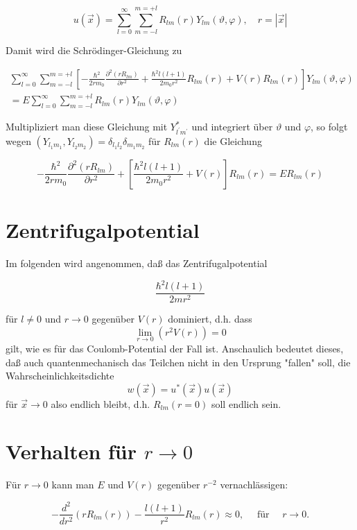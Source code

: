 \documentclass[10pt, letterpaper]{article}
\begin{document}
$$
u(\vec{x})=\sum_{l=0}^{\infty} \sum_{m=-l}^{m=+l} R_{l m}(r) Y_{l m}(\vartheta, \varphi), \quad r=|\vec{x}|
$$

Damit wird die Schrödinger-Gleichung zu

$$
\begin{array}{r}
\sum_{l=0}^{\infty} \sum_{m=-l}^{m=+l}\left[-\frac{\hbar^{2}}{2 r m_{0}} \frac{\partial^{2}\left(r R_{l m}\right)}{\partial r^{2}}+\frac{\hbar^{2} l(l+1)}{2 m_{0} r^{2}} R_{l m}(r)+V(r) R_{l m}(r)\right] Y_{l m}(\vartheta, \varphi) \\
=E \sum_{l=0}^{\infty} \sum_{m=-l}^{m=+l} R_{l m}(r) Y_{l m}(\vartheta, \varphi)
\end{array}
$$

Multipliziert man diese Gleichung mit $Y_{l^{\prime} m^{\prime}}^{*}$ und integriert über $\vartheta$ und $\varphi$, so folgt wegen $\left(Y_{l_{1} m_{1}}, Y_{l_{2} m_{2}}\right)=\delta_{l_{1} l_{2}} \delta_{m_{1} m_{2}}$ für $R_{l m}(r)$ die Gleichung

$$
-\frac{\hbar^{2}}{2 r m_{0}} \frac{\partial^{2}\left(r R_{l m}\right)}{\partial r^{2}}+\left[\frac{\hbar^{2} l(l+1)}{2 m_{0} r^{2}}+V(r)\right] R_{l m}(r)=E R_{l m}(r)
$$

\section*{Zentrifugalpotential}
Im folgenden wird angenommen, daß das Zentrifugalpotential

$$
\frac{\hbar^{2} l(l+1)}{2 m r^{2}}
$$

für $l \neq 0$ und $r \rightarrow 0$ gegenüber $V(r)$ dominiert, d.h. dass
$$
\lim _{r \rightarrow 0}\left(r^{2} V(r)\right)=0
$$
gilt, wie es für das Coulomb-Potential der Fall ist. Anschaulich bedeutet dieses, daß auch quantenmechanisch das Teilchen nicht in den Ursprung "fallen" soll, die Wahrscheinlichkeitsdichte
$$
w(\vec{x})=u^{*}(\vec{x}) u(\vec{x})
$$
für $\vec{x} \rightarrow 0$ also endlich bleibt, d.h. $R_{l m}(r=0)$ soll endlich sein.

\section*{Verhalten für $r \rightarrow 0$}
Für $r \rightarrow 0$ kann man $E$ und $V(r)$ gegenüber $r^{-2}$ vernachlässigen:

$$
-\frac{d^{2}}{d r^{2}}\left(r R_{l m}(r)\right)-\frac{l(l+1)}{r^{2}} R_{l m}(r) \approx 0, \quad \text { für } \quad r \rightarrow 0 .
$$
\end{document}
